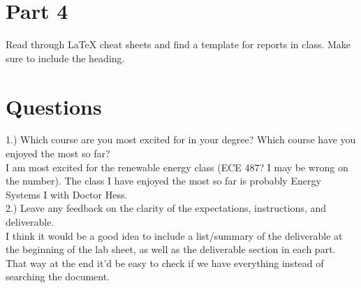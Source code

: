 \documentclass[12pt,a4paper]{article}
\begin{document}
\section{Part 4}\label{sec:intro}
Read through LaTeX cheat sheets and find a template for reports in class. Make sure to include the heading.\\
\section{Questions}\label{sec:intro}
1.) Which course are you most excited for in your degree? Which course have you enjoyed the most so far?\\
I am most excited for the renewable energy class (ECE 487? I may be wrong on the number). The class I have enjoyed the most so far is probably Energy Systems I with Doctor Hess.\\
2.) Leave any feedback on the clarity of the expectations, instructions, and deliverable.\\
I think it would be a good idea to include a list/summary of the deliverable at the beginning of the lab sheet, as well as the deliverable section in each part. That way at the end it'd be easy to check if we have everything instead of searching the document.\\


\end{document}
